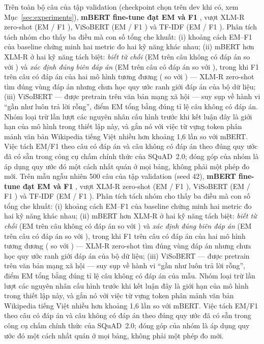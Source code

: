 \ifhasFullEval
Trên toàn bộ \valN{} câu của tập validation (checkpoint chọn trên dev khi có, xem
Mục~\ref{sec:experiments}), \textbf{mBERT fine-tune đạt EM \mbertVoneEM{} và F1
\mbertVoneFone{}}, vượt XLM-R zero-shot (EM \xlmrEM{} / F1 \xlmrFone{}), ViSoBERT (EM
\visoVoneEM{} / F1 \visoVoneFone{}) và TF-IDF (EM \baselineEM{} / F1 \baselineFone{}).
Phân tích tách nhóm cho thấy ba điều mà con số tổng che khuất: (i) khoảng cách EM--F1 của
baseline chứng minh hai metric đo hai kỹ năng khác nhau; (ii) mBERT hơn XLM-R ở hai kỹ năng
tách biệt: \emph{biết từ chối} (EM trên câu không có đáp án \mbertVoneNoAnsEM{} so với
\xlmrNoAnsEM{}) và \emph{xác định đúng biên đáp án} (EM trên câu có đáp án
\mbertVoneHasAnsEM{} so với \xlmrHasAnsEM{}), trong khi F1 trên câu có đáp án của hai mô
hình tương đương (\mbertVoneHasAnsFone{} so với \xlmrHasAnsFone{}) --- XLM-R zero-shot tìm
đúng vùng đáp án nhưng chưa học quy ước ranh giới đáp án của bộ dữ liệu; (iii) ViSoBERT ---
được pretrain trên văn bản mạng xã hội --- suy sụp về hành vi ``gần như luôn trả lời rỗng'',
điểm EM tổng bằng đúng tỉ lệ câu không có đáp án. Nhóm loại trừ lần lượt các nguyên nhân
cấu hình trước khi kết luận đây là giới hạn của mô hình trong thiết lập này, và gắn nó với
việc từ vựng \tokVocabViso{} token phân mảnh văn bản Wikipedia tiếng Việt nhiều hơn khoảng
1,6 lần so với mBERT. Việc tách EM/F1 theo câu có đáp án và câu không có đáp án theo đúng
quy ước đã có sẵn trong công cụ chấm chính thức của SQuAD~2.0; đóng góp của nhóm là áp dụng
quy ước đó một cách nhất quán ở mọi bảng, không phải một phép đo mới.
\else
Trên mẫu ngẫu nhiên 500 câu của tập validation (seed 42), \textbf{mBERT fine-tune đạt
EM \histMbertEM{} và F1 \histMbertFone{}}, vượt XLM-R zero-shot (EM \histXlmrEM{} / F1
\histXlmrFone{}), ViSoBERT (EM \histVisoEM{} / F1 \histVisoFone{}) và TF-IDF (EM
\histBaselineEM{} / F1 \histBaselineFone{}). Phân tích tách nhóm cho thấy ba điều mà con số
tổng che khuất: (i) khoảng cách EM--F1 của baseline chứng minh hai metric đo hai kỹ
năng khác nhau; (ii) mBERT hơn XLM-R ở hai kỹ năng tách biệt: \emph{biết từ chối} (EM trên
câu không có đáp án \histMbertNoAnsEM{} so với \histXlmrNoAnsEM{}) và \emph{xác định đúng
biên đáp án} (EM trên câu có đáp án \histMbertHasAnsEM{} so với \histXlmrHasAnsEM{}), trong
khi F1 trên câu có đáp án của hai mô hình tương đương (\histMbertHasAnsFone{} so với
\histXlmrHasAnsFone{}) --- XLM-R zero-shot tìm đúng vùng đáp án nhưng chưa học quy ước ranh
giới đáp án của bộ dữ liệu; (iii) ViSoBERT --- được pretrain trên văn
bản mạng xã hội --- suy sụp về hành vi ``gần như luôn trả lời rỗng'', điểm EM tổng bằng
đúng tỉ lệ câu không có đáp án của mẫu. Nhóm loại trừ lần lượt các nguyên nhân cấu hình
trước khi kết luận đây là giới hạn của mô hình trong thiết lập này, và gắn nó với việc
từ vựng \tokVocabViso{} token phân mảnh văn bản Wikipedia tiếng Việt nhiều hơn khoảng 1,6
lần so với mBERT. Việc tách EM/F1 theo câu có đáp án và câu không có đáp án theo đúng quy
ước đã có sẵn trong công cụ chấm chính thức của SQuAD~2.0; đóng góp của nhóm là áp dụng quy
ước đó một cách nhất quán ở mọi bảng, không phải một phép đo mới.
\fi

